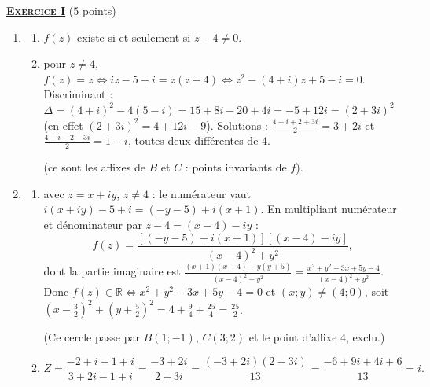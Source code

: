 \providecommand{\Courbe}{(\mathscr{C})}
\providecommand{\cm}{~\mathrm{cm}}
\providecommand{\dx}{~\mathrm{d}x}
%
\noindent \underline{\textsc{\textbf{Exercice I}}} (5 points)
	\begin{enumerate}
		\item \begin{enumerate}
			\item {} $f(z)$ existe si et seulement si $z - 4 \neq 0$.

			\item {}
				pour $z \neq 4$, $f(z) = z \iff iz - 5 + i = z(z-4) \iff z^2 - (4+i)z + 5 - i = 0$.
				Discriminant : $\Delta = (4+i)^2 - 4(5-i) = 15 + 8i - 20 + 4i = -5 + 12i = (2+3i)^2$
				(en effet $(2+3i)^2 = 4 + 12i - 9$).
				Solutions : $\frac{4 + i + 2 + 3i}{2} = 3 + 2i$ et $\frac{4 + i - 2 - 3i}{2} = 1 - i$, toutes deux différentes de $4$.

				 (ce sont les affixes de $B$ et $C$ : points invariants de $f$).
		\end{enumerate}
		\item \begin{enumerate}
			\item {}
				avec $z = x + iy$, $z \neq 4$ : le numérateur vaut $i(x+iy) - 5 + i = (-y-5) + i(x+1)$. En multipliant numérateur
				et dénominateur par $\overline{z-4} = (x-4) - iy$ :
				\[
					f(z) = \frac{\left[(-y-5) + i(x+1)\right]\left[(x-4) - iy\right]}{(x-4)^2 + y^2},
				\]
				dont la partie imaginaire est $\frac{(x+1)(x-4) + y(y+5)}{(x-4)^2+y^2} = \frac{x^2 + y^2 - 3x + 5y - 4}{(x-4)^2 + y^2}$.
				Donc $f(z) \in \mathbb{R} \iff x^2 + y^2 - 3x + 5y - 4 = 0$ et $(x;y) \neq (4;0)$, soit
				$\left(x - \frac{3}{2}\right)^2 + \left(y + \frac{5}{2}\right)^2 = 4 + \frac{9}{4} + \frac{25}{4} = \frac{25}{2}$.


				(Ce cercle passe par $B(1;-1)$, $C(3;2)$ et le point d'affixe $4$, exclu.)
			\item {}
				\[
					Z = \frac{-2 + i - 1 + i}{3 + 2i - 1 + i} = \frac{-3 + 2i}{2 + 3i} = \frac{(-3+2i)(2-3i)}{13} = \frac{-6 + 9i + 4i + 6}{13} = i.
				\]


\end{enumerate}
\end{enumerate}
